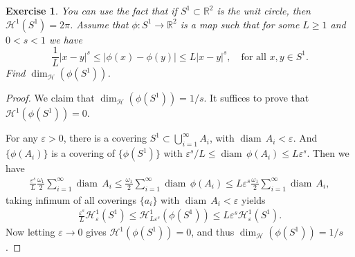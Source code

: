 \documentclass[11pt]{book}
\newtheorem{exercise}{Exercise}[chapter]
\theoremstyle{definition}
\numberwithin{equation}{chapter}
\def\H{{\mathcal H}}
\def\diam{{\operatorname{diam}\,}}
\begin{document}
\begin{exercise}
You can use the fact that if $S^1\subset\mathbb{R}^2$ is the unit circle, then $\H^1(S^1)=2\pi$.
Assume that $\phi:S^1\to\mathbb{R}^2$ is a map such that for some $L\geq 1$ and $0<s<1$ we have
$$
\frac{1}{L}\left|x-y\right|^s\leq \left|\phi(x)-\phi(y)\right|\leq L\left|x-y\right|^s,
\quad
\text{for all $x,y\in S^1$.}
$$
Find $\dim_{\H}(\phi(S^1))$.
\end{exercise}
\begin{proof}
We claim that $\dim_{\H}(\phi(S^1)) = 1/s$. It suffices to prove that $\H^1(\phi(S^1)) = 0$.

For any $\varepsilon > 0$, there is a covering $S^1 \subset \bigcup^\infty_{i=1} A_i$, with $\diam A_i < \varepsilon$. And $\{\phi(A_i)\}$ is a covering of $\{\phi(S^1)\}$ with $\varepsilon^s/L \leq \diam \phi(A_i) \leq L \varepsilon^s$. Then we have
\begin{align*}
    \frac{\varepsilon^s}{L}\frac{\omega_1}{2} \sum^\infty_{i=1} \diam A_i \leq\frac{\omega_1}{2} \sum^\infty_{i=1} \diam \phi(A_i) \leq L \varepsilon^s \frac{\omega_1}{2} \sum^\infty_{i=1} \diam A_i,
\end{align*}
taking infimum of all coverings $\{a_i\}$ with $\diam A_i < \varepsilon$ yields
\begin{align*}
    \frac{\varepsilon^s}{L} \H^1_{\varepsilon}(S^1) \leq \H^1_{L\varepsilon^s}(\phi(S^1)) \leq L \varepsilon^s \H^1_{\varepsilon}(S^1).
\end{align*}
Now letting $\varepsilon \to 0$ gives $\H^1(\phi(S^1)) = 0$, and thus $\dim_{\H}(\phi(S^1)) = 1/s$.
\end{proof}

\medskip
\end{document}

